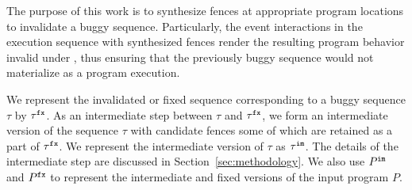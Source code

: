 The purpose of this work is to synthesize \cc fences at appropriate
program locations to invalidate a buggy sequence. Particularly, the
event interactions in the execution sequence with synthesized fences
render the resulting program behavior invalid under \cc, thus ensuring
that the previously buggy sequence would not materialize as a 
\cc program execution.

We represent the invalidated or fixed sequence corresponding to a 
buggy sequence $\tau$ by ${\tau}^{\mathtt{fx}}$. 
%
As an intermediate step between $\tau$ and ${\tau}^{\mathtt{fx}}$, we form an 
intermediate version of the sequence $\tau$ with candidate fences
some of which are retained as a part of ${\tau}^{\mathtt{fx}}$. We represent
the intermediate version of $\tau$ as ${\tau}^{\mathtt{im}}$. The details
of the intermediate step are discussed in Section~\ref{sec:methodology}.
%
We also use ${P}^{\mathtt{im}}$ and ${P}^{\mathtt{fx}}$ to represent the intermediate and
fixed versions of the input program $P$.
